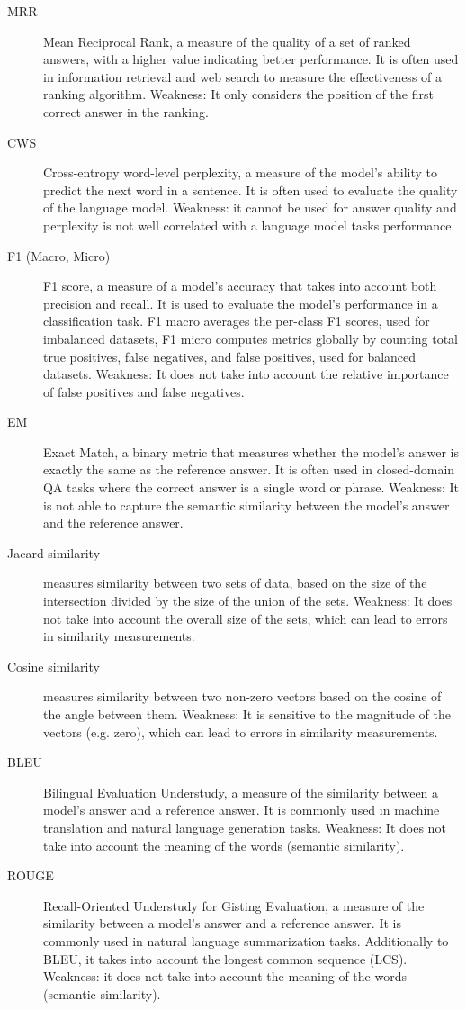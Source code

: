 \documentclass[acmsmall]{acmart}
\begin{document}
\begin{description}
\item [MRR] Mean Reciprocal Rank, a measure of the quality of a set of ranked answers, with a higher value indicating better performance. It is often used in information retrieval and web search to measure the effectiveness of a ranking algorithm. Weakness: It only considers the position of the first correct answer in the ranking.
\item [CWS] Cross-entropy word-level perplexity, a measure of the model's ability to predict the next word in a sentence. It is often used to evaluate the quality of the language model. Weakness: it cannot be used for answer quality and perplexity is not well correlated with a language model tasks performance.
\item [F1 (Macro, Micro)] F1 score, a measure of a model's accuracy that takes into account both precision and recall. It is used to evaluate the model's performance in a classification task. F1 macro averages the per-class F1 scores, used for imbalanced datasets, F1 micro computes metrics globally by counting total true positives, false negatives, and false positives, used for balanced datasets. Weakness: It does not take into account the relative importance of false positives and false negatives.
\item [EM] Exact Match, a binary metric that measures whether the model's answer is exactly the same as the reference answer. It is often used in closed-domain QA tasks where the correct answer is a single word or phrase. Weakness: It is not able to capture the semantic similarity between the model's answer and the reference answer.
\item [Jacard similarity] measures similarity between two sets of data, based on the size of the intersection divided by the size of the union of the sets. Weakness: It does not take into account the overall size of the sets, which can lead to errors in similarity measurements.
\item [Cosine similarity] measures similarity between two non-zero vectors based on the cosine of the angle between them. Weakness: It is sensitive to the magnitude of the vectors (e.g. zero), which can lead to errors in similarity measurements.
\item [BLEU] Bilingual Evaluation Understudy, a measure of the similarity between a model's answer and a reference answer. It is commonly used in machine translation and natural language generation tasks. Weakness: It does not take into account the meaning of the words (semantic similarity).
\item [ROUGE] Recall-Oriented Understudy for Gisting Evaluation, a measure of the similarity between a model's answer and a reference answer. It is commonly used in natural language summarization tasks. Additionally to BLEU, it takes into account the longest common sequence (LCS). Weakness: it does not take into account the meaning of the words (semantic similarity).

\end{description}
\end{document}
